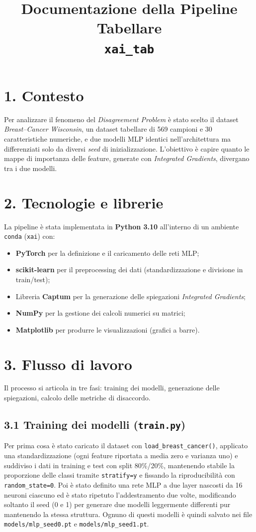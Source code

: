 \documentclass[a4paper,11pt]{article}
\title{Documentazione della Pipeline Tabellare \\ \texttt{xai\_tab}}
\begin{document}
\maketitle

\section*{1. Contesto}
Per analizzare il fenomeno del \emph{Disagreement Problem} è stato scelto il dataset \emph{Breast–Cancer Wisconsin}, un dataset tabellare di 569 campioni e 30 caratteristiche numeriche, e due modelli MLP identici nell'architettura ma differenziati solo da diversi \emph{seed} di inizializzazione. 
L'obiettivo è capire quanto le mappe di importanza delle feature, generate con \emph{Integrated Gradients}, divergano tra i due modelli.

\section*{2. Tecnologie e librerie}
La pipeline è stata implementata in \textbf{Python 3.10} all'interno di un ambiente \texttt{conda} (\texttt{xai}) con:
\begin{itemize}
\item \textbf {PyTorch} per la definizione e il caricamento delle reti MLP;
\item \textbf {scikit-learn} per il preprocessing dei dati (standardizzazione e divisione in train/test);
\item Libreria \textbf {Captum} per la generazione delle spiegazioni \emph{Integrated Gradients};
\item \textbf {NumPy} per la gestione dei calcoli numerici su matrici;
\item \textbf {Matplotlib} per produrre le visualizzazioni (grafici a barre).
\end{itemize} 

\section*{3. Flusso di lavoro}
Il processo si articola in tre fasi: training dei modelli, generazione delle spiegazioni, calcolo delle metriche di disaccordo.

\subsection*{3.1 Training dei modelli (\texttt{train.py})}
Per prima cosa è stato caricato il dataset con \texttt{load\_breast\_cancer()}, applicato una standardizzazione (ogni feature riportata a media zero e varianza uno) e suddiviso i dati in training e test con split 80\%/20\%, mantenendo stabile la proporzione delle classi tramite \texttt{stratify=y} e fissando la riproducibilità con \texttt{random\_state=0}. 
Poi è stato definito una rete MLP a due layer nascosti da 16 neuroni ciascuno ed è stato ripetuto l’addestramento due volte, modificando soltanto il seed (0 e 1) per generare due modelli leggermente differenti pur mantenendo la stessa struttura. 
Ognuno di questi modelli è quindi salvato nei file \texttt{models/mlp\_seed0.pt} e \texttt{models/mlp\_seed1.pt}.
\end{document}
